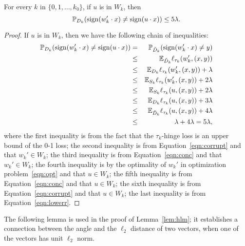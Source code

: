 \begin{lemma}
For every $k$ in $\{0,1,\ldots,k_0\}$, if $u$ is in $W_k$, then
\[ \mathbb{P}_{D_k}(\operatorname{sign}(w_k' \cdot x) \neq \operatorname{sign}(u \cdot x)) \leq 5\lambda. \]
\label{lem:hlm-grt}
\end{lemma}
\begin{proof}
	If $u$ is in $W_k$, then we have the following chain of inequalities:
	\begin{eqnarray*}
	  \mathbb{P}_{D_k}(\operatorname{sign}(w_k' \cdot x) \neq \operatorname{sign}(u \cdot x))
		&=& \mathbb{P}_{\tilde{D}_k}(\operatorname{sign}(w_k' \cdot x) \neq y) \\
	  &\leq& \mathbb{E}_{\tilde{D}_k} \ell_{\tau_k}(w_k', (x, y)) \\
	  &\leq& \mathbb{E}_{D_k} \ell_{\tau_k}(w_k', (x, y)) + \lambda  \\
	  &\leq& \mathbb{E}_{S_k} \ell_{\tau_k}(w_k', (x, y)) + 2\lambda \\
	  &\leq& \mathbb{E}_{S_k} \ell_{\tau_k}(u, (x, y)) + 2\lambda \\
	  &\leq& \mathbb{E}_{D_k} \ell_{\tau_k}(u, (x, y)) + 3\lambda \\
	  &\leq& \mathbb{E}_{\tilde{D}_k} \ell_{\tau_k}(u, (x, y)) + 4\lambda \\
	  &\leq& \lambda + 4\lambda = 5\lambda, \\
	\end{eqnarray*}
	where the first inequality is from the fact that the $\tau_k$-hinge loss is an upper bound of the 0-1 loss; the second inequality is from
	Equation~\eqref{eqn:corrupt} and that $w_k' \in W_k$; the third inequality is from Equation~\eqref{eqn:conc} and that $w_k' \in W_k$;
	the fourth inequality is by the optimality of $w_k'$ in optimization problem~\eqref{eqn:opt} and that $u \in W_k$; the fifth inequality is from Equation~\eqref{eqn:conc} and that $u \in W_k$;
	the sixth inequality is from Equation~\eqref{eqn:corrupt} and that $u \in W_k$; the last inequality is from Equation~\eqref{eqn:lowerr}.
\end{proof}

The following lemma is used in the proof of Lemma~\ref{lem:hlm}; it establishes a connection between the angle and the $\ell_2$ distance of two vectors, when one of the vectors has unit $\ell_2$ norm.

